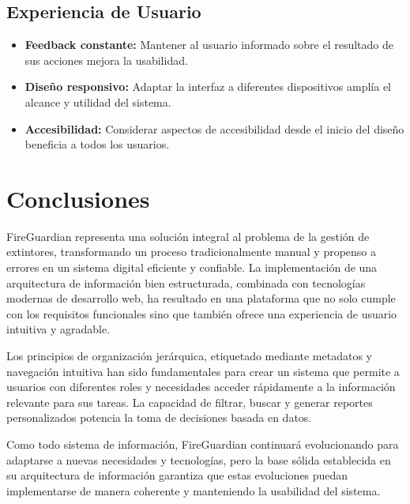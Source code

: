 \documentclass[11pt,a4paper]{article}
\begin{document}
\subsection{Experiencia de Usuario}

\begin{itemize}
    \item \textbf{Feedback constante:} Mantener al usuario informado sobre el resultado de sus acciones mejora la usabilidad.
    \item \textbf{Diseño responsivo:} Adaptar la interfaz a diferentes dispositivos amplía el alcance y utilidad del sistema.
    \item \textbf{Accesibilidad:} Considerar aspectos de accesibilidad desde el inicio del diseño beneficia a todos los usuarios.
\end{itemize}

\section{Conclusiones}

FireGuardian representa una solución integral al problema de la gestión de extintores, transformando un proceso tradicionalmente manual y propenso a errores en un sistema digital eficiente y confiable. La implementación de una arquitectura de información bien estructurada, combinada con tecnologías modernas de desarrollo web, ha resultado en una plataforma que no solo cumple con los requisitos funcionales sino que también ofrece una experiencia de usuario intuitiva y agradable.

Los principios de organización jerárquica, etiquetado mediante metadatos y navegación intuitiva han sido fundamentales para crear un sistema que permite a usuarios con diferentes roles y necesidades acceder rápidamente a la información relevante para sus tareas. La capacidad de filtrar, buscar y generar reportes personalizados potencia la toma de decisiones basada en datos.

Como todo sistema de información, FireGuardian continuará evolucionando para adaptarse a nuevas necesidades y tecnologías, pero la base sólida establecida en su arquitectura de información garantiza que estas evoluciones puedan implementarse de manera coherente y manteniendo la usabilidad del sistema.
\end{document}
